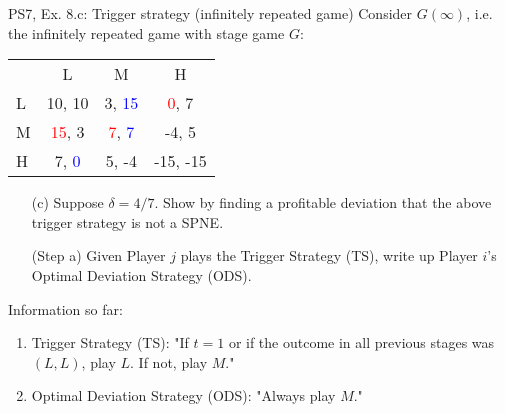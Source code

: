 \begin{frame}{PS7, Ex. 8.c: Trigger strategy (infinitely repeated game)}
    Consider $G(\infty)$, i.e. the infinitely repeated game with stage game $G$: \vspace{-6pt}
    \begin{table}
      \begin{tabular}{l|c|c|c|}
        \multicolumn{1}{c}{} & \multicolumn{1}{c}{L} & \multicolumn{1}{c}{M} & \multicolumn{1}{c}{H} \\\cline{2-4}
        L & 10, 10 & 3, \textcolor{blue}{15} & \textcolor{red}{0}, 7 \\\cline{2-4}
        M & \textcolor{red}{15}, 3 & \textcolor{red}{7}, \textcolor{blue}{7} & -4, 5 \\\cline{2-4}
        H & 7, \textcolor{blue}{0} & 5, -4 & -15, -15 \\\cline{2-4}
      \end{tabular}
    \end{table}
    \begin{itemize}
      \vspace{-4pt} \item[(c)] Suppose $\delta = 4/7$. Show by finding a profitable deviation that the above trigger strategy is not a SPNE. \vspace{-6pt}
    \end{itemize}
  \begin{multicols}{2}
    \begin{itemize}
      \item[(Step a)] Given Player $j$ plays the Trigger Strategy (TS), write up Player $i$'s Optimal Deviation Strategy (ODS).
    \end{itemize}
    \vfill\null\columnbreak
    Information so far:
    \begin{enumerate}
      \item Trigger Strategy (TS): "If $t=1$ or if the outcome in all previous stages was $(L,L)$, play $L$. If not, play $M$."
      \item Optimal Deviation Strategy (ODS): "Always play $M$."
    \end{enumerate}
    \vfill\null
  \end{multicols}
\end{frame}

